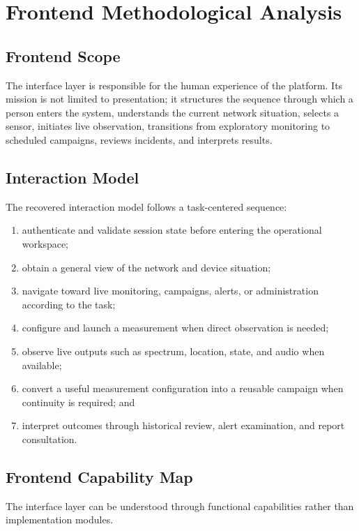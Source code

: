 \documentclass[11pt,a4paper]{article}
\begin{document}
\section{Frontend Methodological Analysis}

\subsection{Frontend Scope}
The interface layer is responsible for the human experience of the platform. Its mission is not limited to presentation; it structures the sequence through which a person enters the system, understands the current network situation, selects a sensor, initiates live observation, transitions from exploratory monitoring to scheduled campaigns, reviews incidents, and interprets results.

\subsection{Interaction Model}
The recovered interaction model follows a task-centered sequence:

\begin{enumerate}
  \item authenticate and validate session state before entering the operational workspace;
  \item obtain a general view of the network and device situation;
  \item navigate toward live monitoring, campaigns, alerts, or administration according to the task;
  \item configure and launch a measurement when direct observation is needed;
  \item observe live outputs such as spectrum, location, state, and audio when available;
  \item convert a useful measurement configuration into a reusable campaign when continuity is required; and
  \item interpret outcomes through historical review, alert examination, and report consultation.
\end{enumerate}

\subsection{Frontend Capability Map}
The interface layer can be understood through functional capabilities rather than implementation modules.
\end{document}
